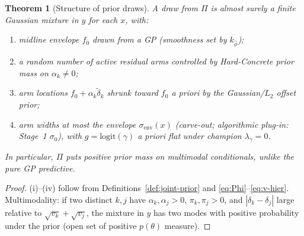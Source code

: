 \documentclass[11pt,a4paper]{article}
\theoremstyle{plain}
\newtheorem{theorem}{Theorem}[section]
\theoremstyle{definition}
\theoremstyle{remark}
\newcommand{\tht}{\theta}
\begin{document}
\begin{theorem}[Structure of prior draws]
\label{thm:prior-draws}
A draw from \(\Pi\) is almost surely a finite Gaussian mixture in \(y\) for each \(x\),
with:
\begin{enumerate}[label=(\roman*)]
  \item midline envelope \(f_0\) drawn from a GP (smoothness set by \(k_{\hat\phi}\));
  \item a random number of active residual arms controlled by Hard-Concrete prior mass on
        \(\alpha_k\neq 0\);
  \item arm locations \(f_0+\alpha_k\tilde\delta_k\) shrunk toward \(f_0\) a priori by the
        Gaussian/\(L_2\) offset prior;
  \item arm widths at most the envelope \(\sigma_{\mathrm{env}}(x)\) (carve-out;
        algorithmic plug-in: Stage~1 \(\sigma_0\)),
        with \(g=\mathrm{logit}(\gamma)\) a priori flat under champion \(\lambda_\gamma=0\).
\end{enumerate}
In particular, \(\Pi\) puts positive prior mass on \emph{multimodal} conditionals, unlike
the pure GP predictive.
\end{theorem}

\begin{proof}
(i)--(iv) follow from Definitions~\ref{def:joint-prior} and \eqref{eq:Phi}--\eqref{eq:v-hier}.
Multimodality: if two distinct \(k,j\) have \(\alpha_k,\alpha_j>0\), \(\pi_k,\pi_j>0\), and
\(|\delta_k-\delta_j|\) large relative to \(\sqrt{v_k}+\sqrt{v_j}\), the mixture in \(y\)
has two modes with positive probability under the prior (open set of positive
\(p(\tht)\) measure).
\end{proof}
\end{document}
